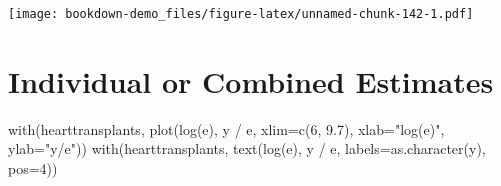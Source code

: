 \documentclass[
]{book}
\newenvironment{Shaded}{\begin{snugshade}}{\end{snugshade}}
\newcommand{\AttributeTok}[1]{\textcolor[rgb]{0.77,0.63,0.00}{#1}}
\newcommand{\ConstantTok}[1]{\textcolor[rgb]{0.00,0.00,0.00}{#1}}
\newcommand{\ControlFlowTok}[1]{\textcolor[rgb]{0.13,0.29,0.53}{\textbf{#1}}}
\newcommand{\DecValTok}[1]{\textcolor[rgb]{0.00,0.00,0.81}{#1}}
\newcommand{\FloatTok}[1]{\textcolor[rgb]{0.00,0.00,0.81}{#1}}
\newcommand{\FunctionTok}[1]{\textcolor[rgb]{0.00,0.00,0.00}{#1}}
\newcommand{\NormalTok}[1]{#1}
\newcommand{\OtherTok}[1]{\textcolor[rgb]{0.56,0.35,0.01}{#1}}
\newcommand{\SpecialCharTok}[1]{\textcolor[rgb]{0.00,0.00,0.00}{#1}}
\newcommand{\StringTok}[1]{\textcolor[rgb]{0.31,0.60,0.02}{#1}}
\begin{document}
\begin{Shaded}
\end{Shaded}

\texttt{[image: bookdown-demo\_files/figure-latex/unnamed-chunk-142-1.pdf]}

\hypertarget{individual-or-combined-estimates}{%
\section{Individual or Combined Estimates}\label{individual-or-combined-estimates}}

\begin{Shaded}
\begin{Highlighting}[]
\FunctionTok{with}\NormalTok{(hearttransplants,}
      \FunctionTok{plot}\NormalTok{(}\FunctionTok{log}\NormalTok{(e), y }\SpecialCharTok{/}\NormalTok{ e, }\AttributeTok{xlim=}\FunctionTok{c}\NormalTok{(}\DecValTok{6}\NormalTok{, }\FloatTok{9.7}\NormalTok{),}
           \AttributeTok{xlab=}\StringTok{"log(e)"}\NormalTok{, }\AttributeTok{ylab=}\StringTok{"y/e"}\NormalTok{))}
 \FunctionTok{with}\NormalTok{(hearttransplants,}
      \FunctionTok{text}\NormalTok{(}\FunctionTok{log}\NormalTok{(e), y }\SpecialCharTok{/}\NormalTok{ e,}
           \AttributeTok{labels=}\FunctionTok{as.character}\NormalTok{(y), }\AttributeTok{pos=}\DecValTok{4}\NormalTok{))}
\end{Highlighting}
\end{Shaded}
\end{document}

